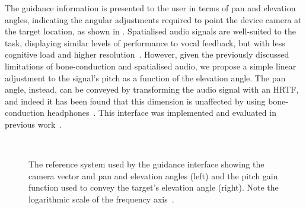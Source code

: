 \documentclass[acmsmall]{acmart}
\begin{document}
The guidance information is presented to the user in terms of pan and elevation angles, indicating the angular adjustments required to point the device camera at the target location, as shown in .
Spatialised audio signals are well-suited to the task, displaying similar levels of performance to vocal feedback, but with less cognitive load and higher resolution~\citep{klatzky2006cognitive}.
However, given the previously discussed limitations of bone-conduction and spatialised audio, we propose a simple linear adjustment to the signal's pitch as a function of the elevation angle. 
The pan angle, instead, can be conveyed by transforming the audio signal with an HRTF, and indeed it has been found that this dimension is unaffected by using bone-conduction headphones~\citep{schonstein2008comparison,macdonald2006spatial,stanley2006lateralization,lock2019bone}. 
This interface was implemented and evaluated in previous work~\citep{lock2019bone}.

\begin{figure}
  \centering
~
  \caption{The reference system used by the guidance interface showing the camera vector and pan and elevation angles (left) and the pitch gain function used to convey the target's elevation angle (right). Note the logarithmic scale of the frequency axis~\citep{lock2019bone}. }
\end{figure}
\end{document}
